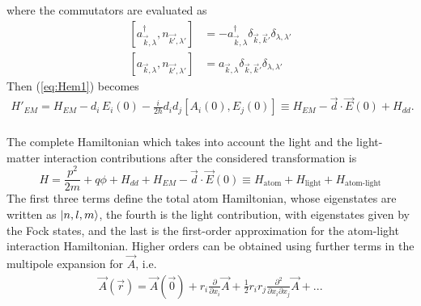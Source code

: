 where the commutators are evaluated as 
\begin{align*}
    \left[a_{\Vec{k},\lambda}^\dagger, n_{\Vec{k'},\lambda'}\right] &= -a_{\vec{k},\lambda}^\dagger \delta_{\vec{k},\vec{k}'} \delta_{\lambda,\lambda'} \\
    \left[a_{\Vec{k},\lambda}, n_{\Vec{k'},\lambda'}\right] &= a_{\vec{k},\lambda} \delta_{\vec{k},\vec{k}'} \delta_{\lambda,\lambda'}
\end{align*}
Then (\ref{eq:Hem1}) becomes 
\begin{align}
    H'_{EM} = H_{EM} - d_i \, E_i(0) - \frac{i}{2 \hbar} d_i d_j \left[ A_i(0), E_j(0)\right] \equiv H_{EM} - \vec{d} \cdot \vec{E}(0) + H_{dd}. 
\end{align}
\\

The complete Hamiltonian which takes into account the light and the light-matter interaction contributions after the considered transformation is 
\begin{equation}
    H = \frac{p^2}{2m}+ q\phi +H_{dd} + H_{EM} - \Vec{d}\cdot\Vec{E}(0) \equiv H_\text{atom} + H_\text{light} + H_\text{atom-light}
    \label{eq:Hamfin}
\end{equation}
The first three terms define the total atom Hamiltonian, whose eigenstates are written as $\ket{n,l,m}$, the fourth is the light contribution, with eigenstates given by the Fock states, and the last is the first-order approximation for the atom-light interaction Hamiltonian. Higher orders can be obtained using further terms in the multipole expansion for $\Vec{A}$, i.e.
\begin{align*}
    \Vec{A}(\Vec{r}) = \Vec{A}(\Vec{0})+ r_i \frac{\partial}{\partial x_i} \Vec{A}+\frac{1}{2} r_i r_j \frac{\partial^2}{\partial x_i \partial x_j} \Vec{A}+ ... 
\end{align*}

